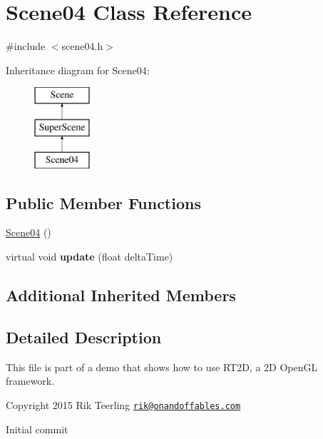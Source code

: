 \hypertarget{class_scene04}{}\section{Scene04 Class Reference}
\label{class_scene04}


{\ttfamily \#include $<$scene04.\+h$>$}

Inheritance diagram for Scene04\+:\begin{figure}[H]
\begin{center}
\leavevmode
\includegraphics[height=3.000000cm]{class_scene04}
\end{center}
\end{figure}
\subsection*{Public Member Functions}
\begin{DoxyCompactItemize}
\item 
\hyperlink{class_scene04_acc9abfd3e2a3bd624ca980ac0589e48d}{Scene04} ()
\item 
\mbox{\label{class_scene04_a492ca1581c60922f7c8959af8adb3035}} 
virtual void {\bfseries update} (float delta\+Time)
\end{DoxyCompactItemize}
\subsection*{Additional Inherited Members}


\subsection{Detailed Description}
This file is part of a demo that shows how to use R\+T2D, a 2D Open\+GL framework.


\begin{DoxyItemize}
\item Copyright 2015 Rik Teerling \href{mailto:rik@onandoffables.com}{\tt rik@onandoffables.\+com}
\begin{DoxyItemize}
\item Initial commit 
\end{DoxyItemize}
\end{DoxyItemize}

